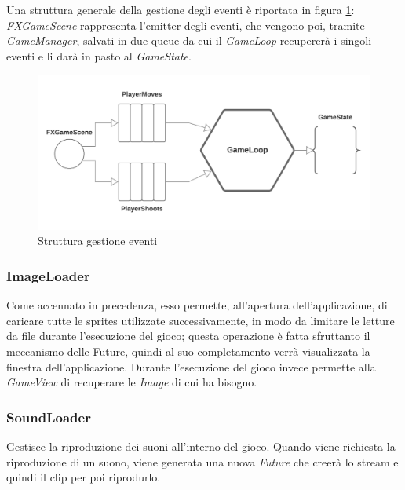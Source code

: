     Una struttura generale della gestione degli eventi è riportata in figura \ref{gameLoop}: \textit{FXGameScene} rappresenta l'emitter degli eventi, che vengono poi, tramite \textit{GameManager}, salvati in due queue da cui il \textit{GameLoop} recupererà i singoli eventi e li darà in pasto al \textit{GameState}.
    
    \begin{figure}[H]
    \centering
      \includegraphics[width=14cm]{res/event_loop_diagram.png}
      \caption{Struttura gestione eventi}
      \label{gameLoop}
    \end{figure}
    
    \subsubsection{ImageLoader} Come accennato in precedenza, esso permette, all'apertura dell'applicazione, di caricare tutte le sprites utilizzate successivamente, in modo da limitare le letture da file durante l'esecuzione del gioco; questa operazione è fatta sfruttanto il meccanismo delle Future, quindi al suo completamento verrà visualizzata la finestra dell'applicazione. 
    Durante l'esecuzione del gioco invece permette alla \textit{GameView} di recuperare le \textit{Image} di cui ha bisogno.
    
    \subsubsection{SoundLoader} Gestisce la riproduzione dei suoni all'interno del gioco. Quando viene richiesta la riproduzione di un suono, viene generata una nuova \textit{Future} che creerà lo stream e quindi il clip per poi riprodurlo.
